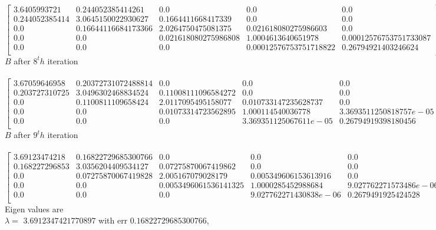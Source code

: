 \documentclass[12pt]{article}
\begin{document}
\\
$
\left[ {\begin{array}{ccccc}
3.6405993721 & 0.244052385414261 & 0.0 & 0.0 & 0.0 \\
0.244052385414 & 3.0645150022930627 & 0.1664411668417339 & 0.0 & 0.0 \\
0.0 & 0.16644116684173366 & 2.0264750475081375 & 0.021618080275986603 & 0.0 \\
0.0 & 0.0 & 0.021618080275986808 & 1.0004613640651978 & 0.00012576753751733087 \\
0.0 & 0.0 & 0.0 & 0.00012576753751718822 & 0.26794921403246624 \\
\end{array} } \right]
$
\\
$B$ after $8^th$ iteration \\
\\
$
\left[ {\begin{array}{ccccc}
3.67059646958 & 0.20372731072488814 & 0.0 & 0.0 & 0.0 \\
0.203727310725 & 3.0496302468834524 & 0.11008111096584272 & 0.0 & 0.0 \\
0.0 & 0.1100811109658424 & 2.0117095495158077 & 0.010733147235628737 & 0.0 \\
0.0 & 0.0 & 0.01073314723562895 & 1.000114540036778 & 3.3693511250818757e-05 \\
0.0 & 0.0 & 0.0 & 3.369351125067611e-05 & 0.26794919398180456 \\
\end{array} } \right]
$
\\
$B$ after $9^th$ iteration \\
\\
$
\left[ {\begin{array}{ccccc}
3.69123474218 & 0.16822729685300766 & 0.0 & 0.0 & 0.0 \\
0.168227296853 & 3.0356204409534127 & 0.07275870067419862 & 0.0 & 0.0 \\
0.0 & 0.07275870067419828 & 2.005167079028179 & 0.005349606153613916 & 0.0 \\
0.0 & 0.0 & 0.0053496061536141325 & 1.0000285452988684 & 9.027762271573486e-06 \\
0.0 & 0.0 & 0.0 & 9.027762271430838e-06 & 0.2679491925424528 \\
\end{array} } \right]
$
\\
Eigen values are \\
$\lambda = $
$3.6912347421770897$ with err $0.16822729685300766$,\\
\end{document}
